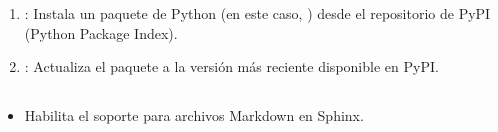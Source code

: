 \documentclass[a4paper,10pt,oneside,spanish,openany]{sphinxmanual}
\begin{document}
\subsubsection{}
\label{\detokenize{comandos_mas_usados/comandos:comando-para-actualizar-la-version-de-sphinx}}
\begin{sphinxVerbatim}[commandchars=\\\{\}]
   
\end{sphinxVerbatim}
\begin{enumerate}
%
\item {} 
\sphinxAtStartPar
{}: Instala un paquete de Python (en este caso, ) desde el repositorio de PyPI (Python Package Index).

\item {} 
\sphinxAtStartPar
{}: Actualiza el paquete a la versión más reciente disponible en PyPI.

\end{enumerate}


\subsection{}
\label{\detokenize{comandos_mas_usados/comandos:instalacion-de-dependencias-necesarias}}

\subsubsection{}
\label{\detokenize{comandos_mas_usados/comandos:instalar-sphinx}}
\begin{sphinxVerbatim}[commandchars=\\\{\}]
  
\end{sphinxVerbatim}


\subsubsection{}
\label{\detokenize{comandos_mas_usados/comandos:instalar-myst-parser}}
\begin{sphinxVerbatim}[commandchars=\\\{\}]
  
\end{sphinxVerbatim}
\begin{itemize}
\item {} 
\sphinxAtStartPar
Habilita el soporte para archivos Markdown en Sphinx.

\end{itemize}
\end{document}

